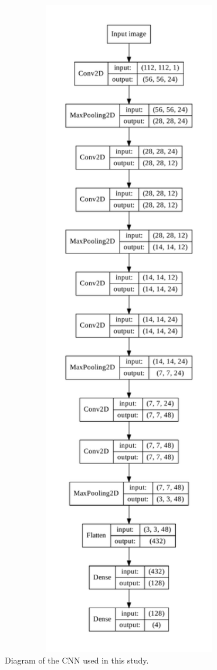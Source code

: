 \documentclass{kththesis}
\begin{document}
\begin{minipage}{.3\linewidth}
  \centering
  \vspace*{-20mm}
  \hspace*{0mm}
  \begin{figure}[H]
      \includegraphics[width=1.7\textwidth]{img/model.pdf}
      \vspace*{-13mm}
      \caption{Diagram of the CNN used in this study.}
      \label{fig:network_structure}
  \end{figure}
\end{minipage}
\end{document}
